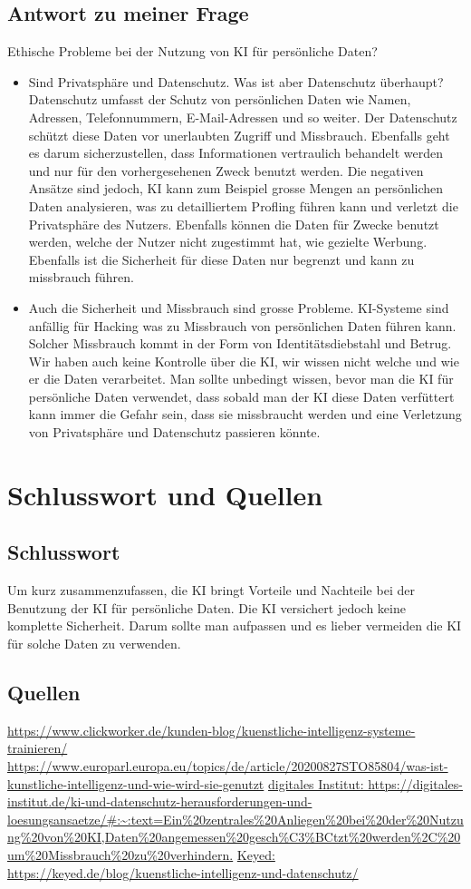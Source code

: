 \documentclass{report}
\begin{document}
\section{Antwort zu meiner Frage}
Ethische Probleme bei der Nutzung von KI für persönliche Daten?
\begin{itemize}
    \item Sind Privatsphäre und Datenschutz. Was ist aber Datenschutz überhaupt? Datenschutz umfasst der Schutz von persönlichen Daten wie Namen, Adressen, Telefonnummern, E-Mail-Adressen und so weiter. Der Datenschutz
    schützt diese Daten vor unerlaubten Zugriff und Missbrauch. Ebenfalls
    geht es darum sicherzustellen, dass Informationen vertraulich behandelt
    werden und nur für den vorhergesehenen Zweck benutzt werden. Die negativen Ansätze sind jedoch, KI kann zum Beispiel grosse Mengen an persönlichen Daten analysieren, was zu detailliertem Profling führen kann
    und verletzt die Privatsphäre des Nutzers. Ebenfalls können die Daten für
    Zwecke benutzt werden, welche der Nutzer nicht zugestimmt hat, wie gezielte Werbung. Ebenfalls ist die Sicherheit für diese Daten nur begrenzt
    und kann zu missbrauch führen. 
    \item Auch die Sicherheit und Missbrauch sind
    grosse Probleme. KI-Systeme sind anfällig für Hacking was zu Missbrauch
    von persönlichen Daten führen kann. Solcher Missbrauch kommt in der
    Form von Identitätsdiebstahl und Betrug. Wir haben auch keine Kontrolle über die KI, wir wissen nicht welche und wie er die Daten verarbeitet.
    Man sollte unbedingt wissen, bevor man die KI für persönliche Daten
    verwendet, dass sobald man der KI diese Daten verfüttert kann immer die
    Gefahr sein, dass sie missbraucht werden und eine Verletzung von Privatsphäre und Datenschutz passieren könnte.
\end{itemize}


\chapter{Schlusswort und Quellen}

\section{Schlusswort}
Um kurz zusammenzufassen, die KI bringt Vorteile und Nachteile bei der Benutzung der KI für persönliche Daten. Die KI versichert jedoch keine komplette Sicherheit. Darum sollte man aufpassen und es lieber vermeiden die KI für solche Daten zu verwenden.

\section{Quellen}
\url {https://www.clickworker.de/kunden-blog/kuenstliche-intelligenz-systeme-trainieren/}
\url {https://www.europarl.europa.eu/topics/de/article/20200827STO85804/was-ist-kunstliche-intelligenz-und-wie-wird-sie-genutzt}
\url{digitales Institut: https://digitales-institut.de/ki-und-datenschutz-herausforderungen-und-loesungsansaetze/#:~:text=Ein%20zentrales%20Anliegen%20bei%20der%20Nutzung%20von%20KI,Daten%20angemessen%20gesch%C3%BCtzt%20werden%2C%20um%20Missbrauch%20zu%20verhindern.}
\url {Keyed: https://keyed.de/blog/kuenstliche-intelligenz-und-datenschutz/}
\end{document}
